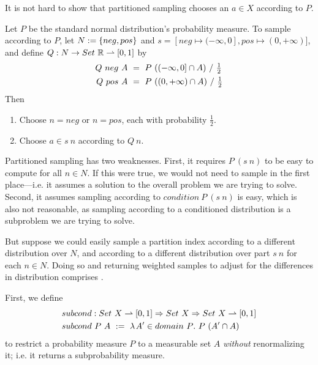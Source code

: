 It is not hard to show that partitioned sampling chooses an $a \in X$ according to $P$.

\begin{example}
\label{ex:partitioned-sampling}
Let $P$ be the standard normal distribution's probability measure.
To sample according to $P$, let $N := \{{neg,pos}\}$ and $s = [neg \mapsto (-\infty,0], pos \mapsto (0,+\infty)]$, and define $Q : N \to Set~\mathbb{R} \rightharpoonup [0,1]$ by
\begin{equation}
\begin{aligned}
	Q~neg~A\ &=\ P~((-\infty,0] \cap A)~{/}~\tfrac{1}{2} \\
	Q~pos~A\ &=\ P~((0,+\infty) \cap A)~{/}~\tfrac{1}{2}
\end{aligned}
\end{equation}
Then
\begin{enumerate}
	\item Choose $n = neg$ or $n = pos$, each with probability $\frac{1}{2}$.
	\item Choose $a \in s~n$ according to $Q~n$.\exampleqed
\end{enumerate}
\end{example}

Partitioned sampling has two weaknesses.
First, it requires $P~(s~n)$ to be easy to compute for all $n \in N$.
If this were true, we would not need to sample in the first place---i.e. it assumes a solution to the overall problem we are trying to solve.
Second, it assumes sampling according to $condition~P~(s~n)$ is easy, which is also not reasonable, as sampling according to a conditioned distribution is a subproblem we are trying to solve.

But suppose we could easily sample a partition index according to a different distribution over $N$, and according to a different distribution over part $s~n$ for each $n \in N$. Doing so and returning weighted samples to adjust for the differences in distribution comprises .

First, we define
\begin{equation}
\begin{aligned}
	&subcond : Set~X \rightharpoonup [0,1] \Rightarrow Set~X \Rightarrow Set~X \rightharpoonup [0,1] \\
	&subcond~P~A\ :=\ \lambda\mspace{2mu}{A' \in domain~P}\ldotp\, P~(A' \cap A)
\end{aligned}
\end{equation}
to restrict a probability measure $P$ to a measurable set $A$ \emph{without} renormalizing it; i.e. it returns a subprobability measure.

